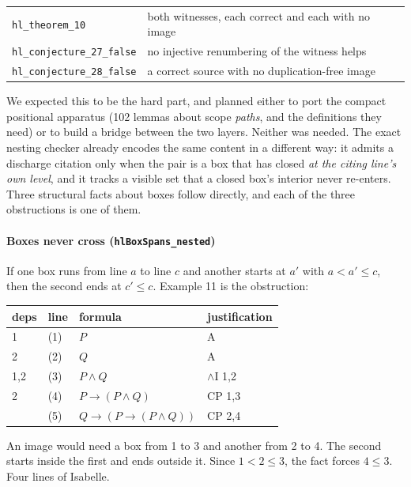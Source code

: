 \documentclass[11pt]{article}
\theoremstyle{plain}
\newcommand{\isa}[1]{\texttt{\small #1}}
\begin{document}
\begin{center}
\begin{tabular}{@{}ll@{}}
\toprule
\isa{hl\_theorem\_10} & both witnesses, each correct and each with no image \\
\isa{hl\_conjecture\_27\_false} & no injective renumbering of the witness helps \\
\isa{hl\_conjecture\_28\_false} & a correct source with no duplication-free image \\
\bottomrule
\end{tabular}
\end{center}

\noindent
We expected this to be the hard part, and planned either to port the compact
positional apparatus (102 lemmas about scope \emph{paths}, and the
definitions they need) or
to build a bridge between the two layers. Neither was needed. The exact
nesting checker already encodes the same content in a different way: it admits
a discharge citation only when the pair is a box that has closed \emph{at the
citing line's own level}, and it tracks a visible set that a closed box's
interior never re-enters. Three structural facts about boxes follow directly,
and each of the three obstructions is one of them.

\paragraph{Boxes never cross \normalfont(\isa{hlBoxSpans\_nested})} If one box
runs from line $a$ to line $c$ and another starts at $a'$ with $a < a' \le c$,
then the second ends at $c' \le c$. Example 11 is the obstruction:

\begin{center}
\begin{tabular}{@{}llll@{}}
\toprule
deps & line & formula & justification \\
\midrule
1    & (1) & $P$                       & A \\
2    & (2) & $Q$                       & A \\
1,2  & (3) & $P \wedge Q$              & $\wedge$I 1,2 \\
2    & (4) & $P \to (P \wedge Q)$      & CP 1,3 \\
     & (5) & $Q \to (P \to (P \wedge Q))$ & CP 2,4 \\
\bottomrule
\end{tabular}
\end{center}

\noindent
An image would need a box from 1 to 3 and another from 2 to 4. The second
starts inside the first and ends outside it. Since $1 < 2 \le 3$, the fact
forces $4 \le 3$. Four lines of Isabelle.
\end{document}
